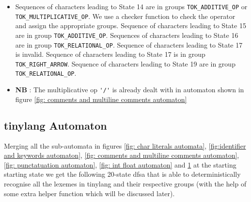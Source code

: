 \begin{itemize}
\begin{figure}[H]
        \label{fig: additive op relative op automata}
    \end{figure}
    \begin{itemize}
        \item Sequences of characters leading to State 14 are in groups \verb!TOK_ADDITIVE_OP! or \verb!TOK_MULTIPLICATIVE_OP!. We use a checker function to check the operator and  assign the appropriate groups. Sequence of characters leading to State 15 are in group \verb!TOK_ADDITIVE_OP!. Sequences of characters leading to State 16 are in group \verb!TOK_RELATIONAL_OP!. Sequence of characters leading to State 17 is invalid. Sequence of characters leading to State 17 is in group \verb!TOK_RIGHT_ARROW!. Sequence of characters leading to State 19 are in group \verb!TOK_RELATIONAL_OP!.
        \item \textbf{NB} : The multiplicative op \verb!'/'! is already dealt with in automaton shown in figure \ref{fig: comments and multiline comments automaton}
    
    
    \end{itemize}


\end{itemize}
\vskip 2in
\subsection{tinylang Automaton}
Merging all the sub-automata in figures \ref{fig: char literals automata}, \ref{fig:identifier and keywords automaton}, \ref{fig: comments and multiline comments automaton}, \ref{fig: punctatuation automaton}, \ref{fig: int float automaton} and \ref{fig: additive op relative op automata} at the starting starting state we get the following 20-state dfsa that is able to deterministically recognise all the lexemes in tinylang and their respective groups (with the help of some extra helper function which will be discussed later).

